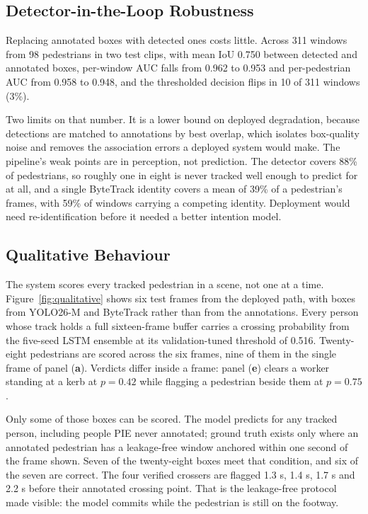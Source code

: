 \documentclass[mti,article,submit,moreauthors]{Definitions/mdpi}
\begin{document}
\subsection{Detector-in-the-Loop Robustness}

Replacing annotated boxes with detected ones costs little. Across 311 windows from 98 pedestrians in two test clips, with mean IoU 0.750 between detected and annotated boxes, per-window AUC falls from 0.962 to 0.953 and per-pedestrian AUC from 0.958 to 0.948, and the thresholded decision flips in 10 of 311 windows (3\%).

Two limits on that number. It is a lower bound on deployed degradation, because detections are matched to annotations by best overlap, which isolates box-quality noise and removes the association errors a deployed system would make. The pipeline's weak points are in perception, not prediction. The detector covers 88\% of pedestrians, so roughly one in eight is never tracked well enough to predict for at all, and a single ByteTrack identity covers a mean of 39\% of a pedestrian's frames, with 59\% of windows carrying a competing identity. Deployment would need re-identification before it needed a better intention model.

\subsection{Qualitative Behaviour}

The system scores every tracked pedestrian in a scene, not one at a time. Figure~\ref{fig:qualitative} shows six test frames from the deployed path, with boxes from YOLO26-M and ByteTrack rather than from the annotations. Every person whose track holds a full sixteen-frame buffer carries a crossing probability from the five-seed LSTM ensemble at its validation-tuned threshold of 0.516. Twenty-eight pedestrians are scored across the six frames, nine of them in the single frame of panel (\textbf{a}). Verdicts differ inside a frame: panel (\textbf{e}) clears a worker standing at a kerb at $p = 0.42$ while flagging a pedestrian beside them at $p = 0.75$.

Only some of those boxes can be scored. The model predicts for any tracked person, including people PIE never annotated; ground truth exists only where an annotated pedestrian has a leakage-free window anchored within one second of the frame shown. Seven of the twenty-eight boxes meet that condition, and six of the seven are correct. The four verified crossers are flagged 1.3 s, 1.4 s, 1.7 s and 2.2 s before their annotated crossing point. That is the leakage-free protocol made visible: the model commits while the pedestrian is still on the footway.
\end{document}

